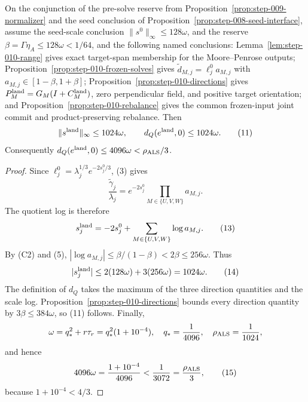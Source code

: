 \begin{proposition}\label{prop:step-010-quotient-entry}
On the conjunction of the pre-solve reserve from Proposition~\ref{prop:step-009-normalizer}
and the seed conclusion of Proposition~\ref{prop:step-008-seed-interface}, assume
the seed-scale conclusion \(\|s^0\|_\infty\le128\omega\), and the reserve
\(\beta=\Gamma\eta_A\le128\omega<1/64\), and the following named
conclusions: Lemma~\ref{lem:step-010-range} gives exact target-span
membership for the Moore--Penrose outputs; Proposition~\ref{prop:step-010-frozen-solves}
gives \(\widetilde d_{M,j}=\ell_j^0a_{M,j}\) with
\(a_{M,j}\in[1-\beta,1+\beta]\); Proposition~\ref{prop:step-010-directions}
gives \(P_M^{\rm land}=G_M(I+C_M^{\rm land})\), zero perpendicular field, and
positive target orientation; and Proposition~\ref{prop:step-010-rebalance} gives the common
frozen-input joint commit and product-preserving rebalance.  Then
\[
\|s^{\rm land}\|_\infty\le1024\omega,\qquad
d_Q(e^{\rm land},0)\le1024\omega.
\tag{11}
\]
Consequently \(d_Q(e^{\rm land},0)\le4096\omega<\rho_{\rm ALS}/3\).

\begin{proof}
Since
\(\ell_j^0=\lambda_j^{1/3}e^{-2s_j^0/3}\), (3) gives
\[
\frac{\widetilde\gamma_j}{\lambda_j}
=e^{-2s_j^0}\prod_{M\in\{U,V,W\}}a_{M,j}.
\tag{12}
\]
The quotient log is therefore
\[
s_j^{\rm land}=-2s_j^0+\sum_{M\in\{U,V,W\}}\log a_{M,j}. \tag{13}
\]
By (C2) and (5), \(|\log a_{M,j}|\le\beta/(1-\beta)<2\beta\le256\omega\).
Thus
\[
|s_j^{\rm land}|\le2(128\omega)+3(256\omega)=1024\omega. \tag{14}
\]
The definition of \(d_Q\) takes the maximum of the three direction
quantities and the scale log.  Proposition~\ref{prop:step-010-directions}
bounds every direction quantity by \(3\beta\le384\omega\), so (11) follows.
Finally,
\[
\omega=q_*^2+r\tau_r=q_*^2(1+10^{-4}),\quad
q_*={1\over4096},\quad \rho_{\rm ALS}={1\over1024},
\]
and hence
\[
4096\omega={1+10^{-4}\over4096}
<{1\over3072}={\rho_{\rm ALS}\over3},
\tag{15}
\]
because \(1+10^{-4}<4/3\).

\end{proof}
\end{proposition}
